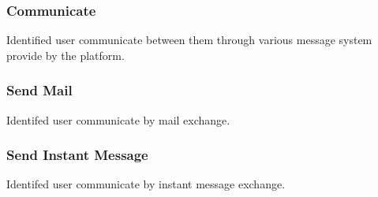 	\subsubsection{Communicate}
		Identified user communicate between them through various message system provide by the platform.
	\subsubsection{Send Mail}
		Identifed user communicate by mail exchange.
	\subsubsection{Send Instant Message}
		Identifed user communicate by instant message exchange.
